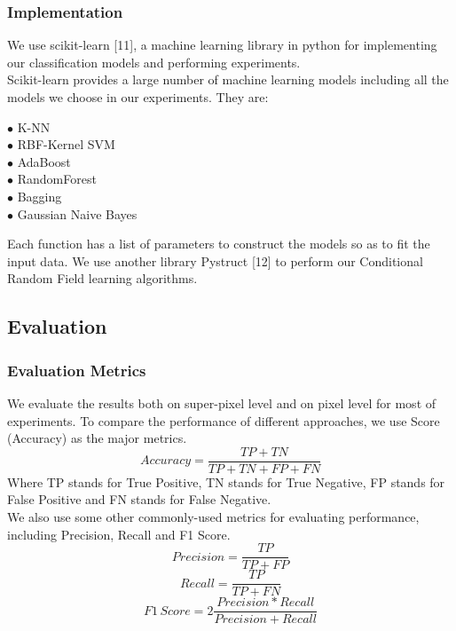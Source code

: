 \documentclass{article} %
\begin{document}
\subsubsection{Implementation}
We use scikit-learn [11], a machine learning library in python for implementing our classification models and performing experiments. \\
Scikit-learn provides a large number of machine learning models including all the models we choose in our experiments. They are:
\begin{adjustwidth}{2em}{0em}
$ \bullet  $	K-NN\\
$ \bullet  $	RBF-Kernel SVM\\
$ \bullet  $	AdaBoost\\
$ \bullet  $	RandomForest\\
$ \bullet  $ 	Bagging\\
$ \bullet  $ 	Gaussian Naive Bayes\\
\end{adjustwidth}
Each function has a list of parameters to construct the models so as to fit the input data. We use another library Pystruct [12] to perform our Conditional Random Field learning algorithms. 

\subsection{Evaluation}
\subsubsection{Evaluation Metrics}
We evaluate the results both on super-pixel level and on pixel level for most of experiments. To compare the performance of different approaches, we use Score (Accuracy) as the major metrics.\\
\begin{equation}
Accuracy=\frac{TP+TN}{TP+TN+FP+FN}
\end{equation}
Where TP stands for True Positive, TN stands for True Negative, FP stands for False Positive and FN stands for False Negative.\\

We also use some other commonly-used metrics for evaluating performance, including Precision, Recall and F1 Score.\\
\begin{equation}
Precision = \frac{TP}{TP+FP}
\end{equation}
\begin{equation}
Recall = \frac{TP}{TP+FN}
\end{equation}
\begin{equation}
F1\,Score = 2\frac{Precision*Recall}{Precision+Recall}
\end{equation}
\end{document}
